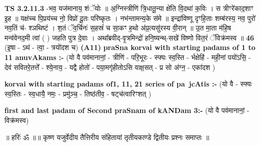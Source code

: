\documentclass[17pt]{extarticle}
\begin{document}
                  \newline
                                \textbf{ TS 3.2.11.3} \newline
                  -भव॒ यज॑मानाय॒ शंॅयोः ॥ अ॒ग्निस्त्रीणि॑ त्रि॒धातू॒न्या क्षे॑ति वि॒दथा॑ क॒विः । स त्रीꣳरे॑काद॒शाꣳ इ॒ह ॥ यक्ष॑च्च पि॒प्रय॑च्च नो॒ विप्रो॑ दू॒तः परि॑ष्कृतः । नभ॑न्तामन्य॒के स॑मे ॥ इन्द्रा॑विष्णू दृꣳहि॒ताः शम्ब॑रस्य॒ नव॒ पुरो॑ नव॒तिं च॑- श्ञथिष्टं । श॒तं ॅव॒र्चिनः॑ स॒हस्रं॑ च सा॒कꣳ ह॒थो अ॑प्र॒त्यसु॑रस्य वी॒रान् ॥ उ॒त मा॒ता म॑हि॒ष मन्व॑वेनद॒मी त्वा॑ ( ) जहति पुत्र दे॒वाः । अथा᳚ब्रवीद्-वृ॒त्रमिन्द्रो॑ हनि॒ष्यन्थ्-सखे॑ विष्णो वित॒रं ॅविक्र॑मस्व ॥ \textbf{  46} \newline
                  \newline
                      (इ॒षा - ऽथ॑ - त्वा॒ - त्रयो॑दश च)  \textbf{(A11)} \newline \newline
                \textbf{praSna korvai with starting padams of 1 to 11 anuvAkams :-} \newline
        (यो वै पव॑मानानां॒ - त्रीणि॑ - परि॒भूरः - स्फ्यः स्व॒स्ति - र्भक्षेहि॑ - मही॒नां पयो॑ऽसि॒ - देव॑ सवितरे॒तत्ते᳚ - श्ये॒नाय॒ - यद्वै होतो॑ - पया॒मगृ॑हीतोऽसि वाक्ष॒सत् - प्र सो अ॑ग्न॒ - एका॑दश ) \newline

        \textbf{korvai with starting padams of1, 11, 21 series of pa~jcAtis :-} \newline
        (यो वै - स्फ्यः स्व॒स्तिः - स्व॒धायै॒ नमः॒ - प्रमु॑ञ्च॒ - तिष्ठ॑तीव॒ - षट्च॑त्वारिꣳशत् ) \newline

        \textbf{first and last padam of Second praSnam of kANDam 3:-} \newline
        (यो वै पव॑मानानां॒ - विक्र॑मस्व) \newline 

        
        ॥ हरिः॑ ॐ ॥॥ कृष्ण यजुर्वेदीय तैत्तिरीय संहितायां तृतीयकाण्डे द्वितीयः प्रश्नः समाप्तः ॥ \newline
        \pagebreak
                \pagebreak
        
\end{document}
